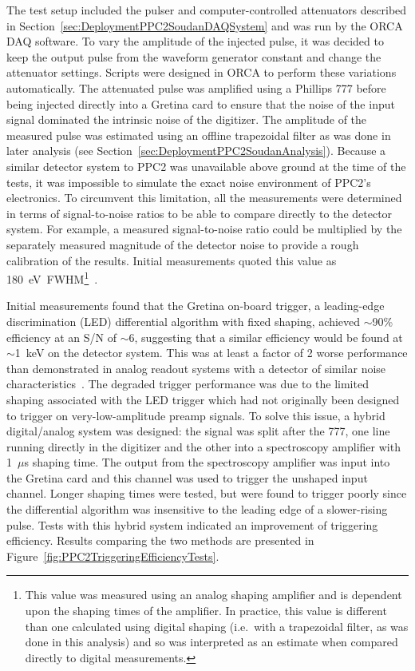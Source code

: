 	The test setup included the pulser and computer-controlled attenuators described in Section~\ref{sec:DeploymentPPC2SoudanDAQSystem} and was run by the ORCA DAQ software.  To vary the amplitude of the injected pulse, it was decided to keep the output pulse from the waveform generator constant and change the attenuator settings.  Scripts were designed in ORCA to perform these variations automatically.  The attenuated pulse was amplified using a Phillips 777 before being injected directly into a Gretina card to ensure that the noise of the input signal dominated the intrinsic noise of the digitizer.  The amplitude of the measured pulse was estimated using an offline trapezoidal filter as was done in later analysis (see Section~\ref{sec:DeploymentPPC2SoudanAnalysis}).  Because a similar detector system to PPC2 was unavailable above ground at the time of the tests, it was impossible to simulate the exact noise environment of PPC2's electronics.  To circumvent this limitation, all the measurements were determined in terms of signal-to-noise ratios to be able to compare directly to the detector system.  For example, a measured signal-to-noise ratio could be multiplied by the separately measured magnitude of the detector noise to provide a rough calibration of the results.  Initial measurements quoted this value as 180~eV~FWHM\footnote{This value was measured using an analog shaping amplifier and is dependent upon the shaping times of the amplifier.  In practice, this value is different than one calculated using digital shaping (i.e.~with a trapezoidal filter, as was done in this analysis) and so was interpreted as an estimate when compared directly to digital measurements.}~\cite{Orr2007}.  
	
		Initial measurements found that the Gretina on-board trigger, a leading-edge discrimination (LED) differential algorithm with fixed shaping, achieved $\sim$90\% efficiency at an S/N of $\sim$6, suggesting that a similar efficiency would be found at $\sim$1~keV on the detector system.  This was at least a factor of 2 worse performance than demonstrated in analog readout systems with a detector of similar noise characteristics~\cite{Barb07}.  The degraded trigger performance was due to the limited shaping associated with the LED trigger which had not originally been designed to trigger on very-low-amplitude preamp signals.  To solve this issue, a hybrid digital/analog system was designed: the signal was split after the 777, one line running directly in the digitizer and the other into a spectroscopy amplifier with 1~$\mu$s shaping time.  The output from the spectroscopy amplifier was input into the Gretina card and this channel was used to trigger the unshaped input channel.  Longer shaping times were tested, but were found to trigger poorly since the differential algorithm was insensitive to the leading edge of a slower-rising pulse.  Tests with this hybrid system indicated an improvement of triggering efficiency.  Results comparing the two methods are presented in Figure~\ref{fig:PPC2TriggeringEfficiencyTests}.  
	
